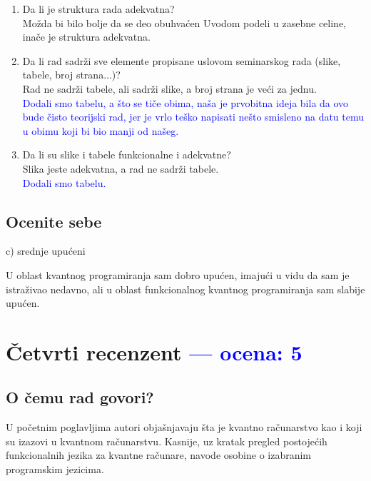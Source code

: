 \documentclass[a4paper]{report}
\newcommand{\odgovor}[1]{\textcolor{blue}{#1}}
\begin{document}
\begin{enumerate}
\item Da li je struktura rada adekvatna?\\
Možda bi bilo bolje da se deo obuhvaćen Uvodom podeli u zasebne celine, inače je struktura adekvatna.
\item Da li rad sadrži sve elemente propisane uslovom seminarskog rada (slike, tabele, broj strana...)?\\
Rad ne sadrži tabele, ali sadrži slike, a broj strana je veći za jednu.\\
\odgovor {Dodali smo tabelu, a što se tiče obima, naša je prvobitna ideja bila da ovo bude čisto teorijski rad, jer je vrlo teško napisati nešto smisleno na datu temu u obimu koji bi bio manji od našeg.}
\item Da li su slike i tabele funkcionalne i adekvatne?\\
Slika jeste adekvatna, a rad ne sadrži tabele.\\
\odgovor {Dodali smo tabelu.}
\end{enumerate}

\section{Ocenite sebe}
 c) srednje upućeni

U oblast kvantnog programiranja sam dobro upućen, imajući u vidu da sam je istraživao nedavno, ali u oblast funkcionalnog kvantnog programiranja sam slabije upućen.


\chapter{Četvrti recenzent \odgovor{--- ocena: 5 } }%

\section{O čemu rad govori?}
U početnim poglavljima autori objašnjavaju šta je kvantno računarstvo kao i koji su izazovi u kvantnom računarstvu. Kasnije, uz kratak pregled postojećih funkcionalnih jezika za kvantne računare, navode osobine o izabranim programskim jezicima.
\end{document}
